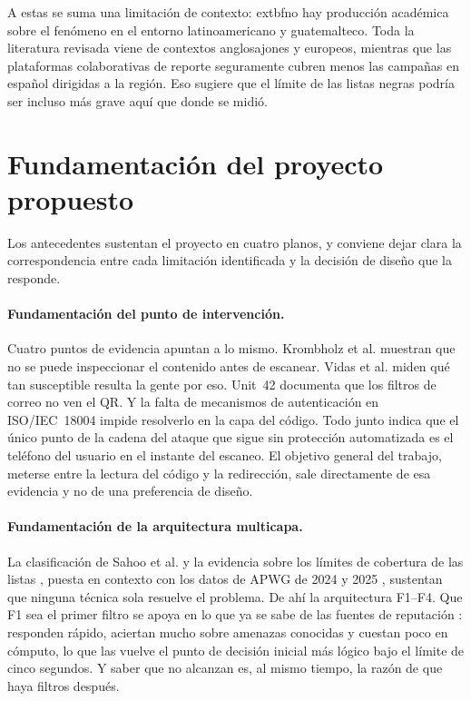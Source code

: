 A estas se suma una limitación de contexto: 	extbf{no hay producción académica sobre
el fenómeno en el entorno latinoamericano y guatemalteco}. Toda la literatura revisada
viene de contextos anglosajones y europeos, mientras que las plataformas colaborativas de
reporte seguramente cubren menos las campañas en español dirigidas a la región. Eso
sugiere que el límite de las listas negras podría ser incluso más grave aquí que donde se
midió.

\section{Fundamentación del proyecto propuesto}

Los antecedentes sustentan el proyecto en cuatro planos, y conviene dejar clara la
correspondencia entre cada limitación identificada y la decisión de diseño que la
responde.

\paragraph{Fundamentación del punto de intervención.}
Cuatro puntos de evidencia apuntan a lo mismo. Krombholz et al.
\cite{krombholz2014qr} muestran que no se puede inspeccionar el contenido antes de
escanear. Vidas et al. \cite{vidas2013qrishing} miden qué tan susceptible resulta la
gente por eso. Unit~42 \cite{unit42_2023qr} documenta que los filtros de correo no ven el
QR. Y la falta de mecanismos de autenticación en ISO/IEC~18004
\cite{iso18004_2015,iso18004_2024} impide resolverlo en la capa del código. Todo junto
indica que el único punto de la cadena del ataque que sigue sin protección automatizada
es el teléfono del usuario en el instante del escaneo. El objetivo general del trabajo,
meterse entre la lectura del código y la redirección, sale directamente de esa evidencia
y no de una preferencia de diseño.

\paragraph{Fundamentación de la arquitectura multicapa.}
La clasificación de Sahoo et al. \cite{sahoo2017malicious} y la evidencia sobre los
límites de cobertura de las listas \cite{sheng2009empirical}, puesta en contexto con los
datos de APWG de 2024 y 2025 \cite{apwg2024q1,apwg2025q1}, sustentan que ninguna técnica
sola resuelve el problema. De ahí la arquitectura F1--F4. Que F1 sea el primer filtro se
apoya en lo que ya se sabe de las fuentes de reputación
\cite{google_safebrowsing,virustotal_apiv3,phishtank_devinfo}: responden rápido, aciertan
mucho sobre amenazas conocidas y cuestan poco en cómputo, lo que las vuelve el punto de
decisión inicial más lógico bajo el límite de cinco segundos. Y saber que no alcanzan es,
al mismo tiempo, la razón de que haya filtros después.

